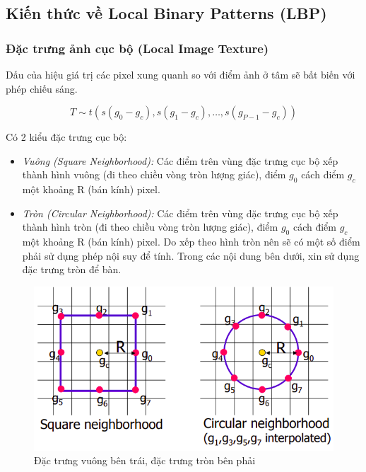 \subsection{Kiến thức về Local Binary Patterns (LBP)}

\subsubsection*{Đặc trưng ảnh cục bộ (Local Image Texture)}
Dấu của hiệu giá trị các pixel xung quanh so với điểm ảnh ở tâm sẽ bất biến với phép chiếu sáng.

\begin{equation}
	T \sim t(s(g_0-g_c), s(g_1-g_c),\ldots,s(g_{P-1} - g_c))
\end{equation}

Có 2 kiểu đặc trưng cục bộ:
\begin{itemize}
	\item \textit{Vuông (Square Neighborhood):} Các điểm trên vùng đặc trưng cục bộ xếp thành hình vuông (đi theo chiều vòng tròn lượng giác), điểm $g_0$ cách điểm $g_c$ một khoảng R (bán kính) pixel. 
	\item \textit{Tròn (Circular Neighborhood):} Các điểm trên vùng đặc trưng cục bộ xếp thành hình tròn (đi theo chiều vòng tròn lượng giác), điểm $g_0$ cách điểm $g_c$ một khoảng R (bán kính) pixel. Do xếp theo hình tròn nên sẽ có một số điểm phải sử dụng phép nội suy để tính. Trong các nội dung bên dưới, xin sử dụng đặc trưng tròn để bàn.
\end{itemize}
\begin{figure}[H]
	\begin{center}
		\includegraphics[scale=0.6]{images/theo1/local_image_texture}
		\caption{Đặc trưng vuông bên trái, đặc trưng tròn bên phải}
	\end{center}
\end{figure}
\pagebreak

